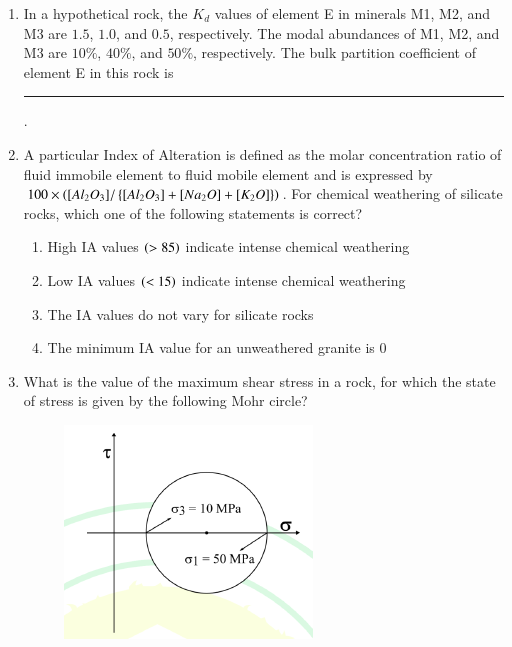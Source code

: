 \documentclass[journal,12pt,onecolumn]{IEEEtran}
\theoremstyle{remark}
\begin{document}
\begin{enumerate}
\item In a hypothetical rock, the $K_d$ values of element E in minerals M1, M2, and M3 are $1.5$, $1.0$, and $0.5$, respectively. The modal abundances of M1, M2, and M3 are $10\%$, $40\%$, and $50\%$, respectively. The bulk partition coefficient of element E in this rock is \rule{3cm}{0.15mm}.  \hfill{}

\item A particular Index of Alteration  is defined as the molar concentration ratio  of fluid immobile element to fluid mobile element and is expressed by $100 \times \left([Al_2O_3] / \left\{[Al_2O_3] + [Na_2O] + [K_2O]\right\}\right)$. For chemical weathering of silicate rocks, which one of the following statements is correct? \hfill{}
\begin{enumerate}
    \item High IA values $\left(> 85\right)$ indicate intense chemical weathering
    \item Low IA values $\left(< 15\right)$ indicate intense chemical weathering
    \item The IA values do not vary for silicate rocks
    \item The minimum IA value for an unweathered granite is $0$
\end{enumerate}

\item What is the value of the maximum shear stress in a rock, for which the state of stress is given by the following Mohr circle?
\begin{figure}[H]
    \centering
    \includegraphics[width=0.5\columnwidth]{figs/fig8.png}
    \caption{}
    \label{fig:q46}
\end{figure}
\hfill{}
\begin{enumerate}
\end{enumerate}


\end{enumerate}
\end{document}
